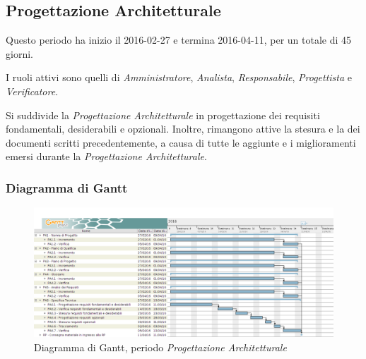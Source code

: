 \newpage

\subsection{Progettazione Architetturale}
Questo periodo ha inizio il 2016-02-27 e termina 2016-04-11, per un totale di 45 giorni.

I ruoli attivi sono quelli di \textit{Amministratore}, \textit{Analista}, \textit{Responsabile}, \textit{Progettista} e \textit{Verificatore}.

Si suddivide la \textit{Progettazione Architetturale} in progettazione dei requisiti fondamentali, desiderabili e opzionali. Inoltre, rimangono attive la stesura e la  dei documenti scritti precedentemente, a causa di tutte le aggiunte e i miglioramenti emersi durante la \textit{Progettazione Architetturale}.

\subsubsection{Diagramma di Gantt}
\begin{figure}[ht!]
  \includegraphics[width=1\textwidth]{res/img/pianificazione/ProgettazioneArchitetturale}
  \caption{Diagramma di Gantt, periodo \textit{Progettazione Architetturale}}
\end{figure}

